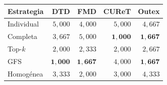 \begin{resulttable}
\centering\fontsize{9}{11}\selectfont\setlength{\tabcolsep}{3.6pt}
\caption{Rankings medios por dataset según Quade, calculados sobre macro-F1 para las cinco estrategias y 21 descriptores.}
\label{tab:rank-dataset-quade}
\begin{tabular}{@{}lrrrr@{}}
\toprule
Estrategia & DTD & FMD & CUReT & Outex \\
\midrule
Individual & $5{,}000$ & $4{,}000$ & $5{,}000$ & $4{,}667$ \\
Completa & $3{,}667$ & $5{,}000$ & $\mathbf{1{,}000}$ & $\mathbf{1{,}667}$ \\
Top-$k$ & $2{,}000$ & $2{,}333$ & $2{,}000$ & $2{,}667$ \\
GFS & $\mathbf{1{,}000}$ & $\mathbf{1{,}667}$ & $4{,}000$ & $\mathbf{1{,}667}$ \\
Homogénea & $3{,}333$ & $2{,}000$ & $3{,}000$ & $4{,}333$ \\
\bottomrule
\end{tabular}
\par{}
\end{resulttable}
\FloatBarrier

